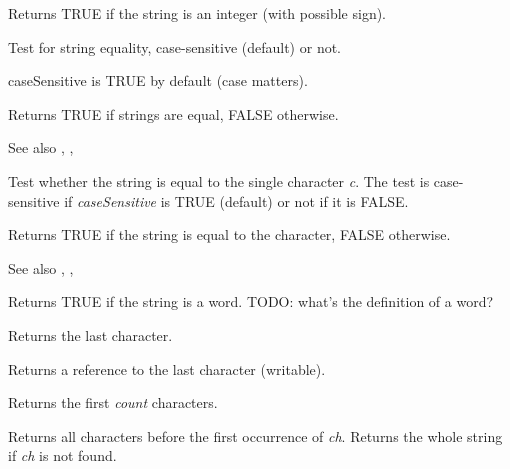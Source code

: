 Returns TRUE if the string is an integer (with possible sign).

\label{wxstringissameas}


Test for string equality, case-sensitive (default) or not.

caseSensitive is TRUE by default (case matters).

Returns TRUE if strings are equal, FALSE otherwise.

See also , , 

\label{wxstringissameas2}


Test whether the string is equal to the single character {\it c}. The test is
case-sensitive if {\it caseSensitive} is TRUE (default) or not if it is FALSE.

Returns TRUE if the string is equal to the character, FALSE otherwise.

See also , , 

\label{wxstringisword}


Returns TRUE if the string is a word. TODO: what's the definition of a word?

\label{wxstringlast}


Returns the last character.


Returns a reference to the last character (writable).

\label{wxstringleft}


Returns the first {\it count} characters.


Returns all characters before the first occurrence of {\it ch}.
Returns the whole string if {\it ch} is not found.

